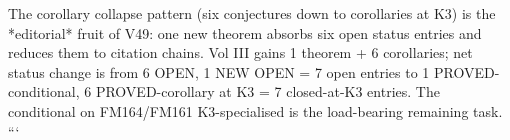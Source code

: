 The corollary collapse pattern (six conjectures down to corollaries at K3) is the *editorial* fruit of V49: one new theorem absorbs six open status entries and reduces them to citation chains. Vol III gains 1 theorem + 6 corollaries; net status change is from {6 OPEN, 1 NEW OPEN} = 7 open entries to {1 PROVED-conditional, 6 PROVED-corollary at K3} = 7 closed-at-K3 entries. The conditional on FM164/FM161 K3-specialised is the load-bearing remaining task.
```


